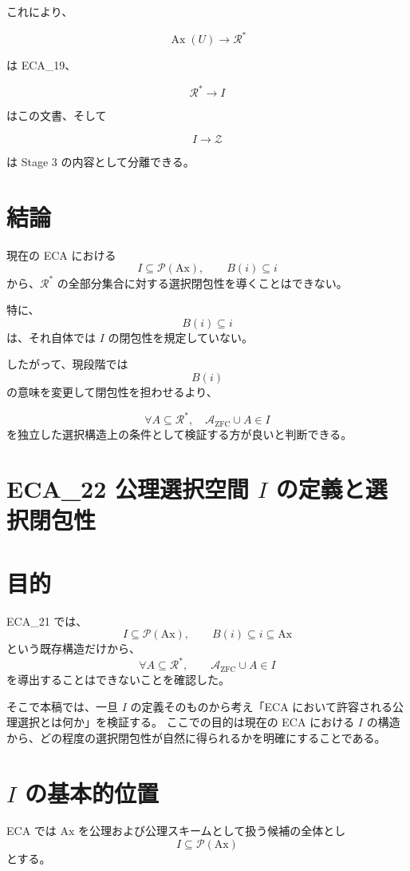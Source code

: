 \documentclass[a4paper,11pt]{article}
\newcommand{\Ax}{\mathrm{Ax}}
\begin{document}
これにより、

\[
\operatorname{Ax}(U)
\to
\mathcal{R}^*
\]

は ECA_19、

\[
\mathcal{R}^*
\to
I
\]

はこの文書、そして

\[
I
\to
\mathcal{Z}
\]

は Stage 3 の内容として分離できる。

\section{結論}

現在の ECA における
\[
I\subseteq\mathcal{P}(\Ax),
\qquad
B(i)\subseteq i
\]
から、$\mathcal{R}^*$ の全部分集合に対する選択閉包性を導くことはできない。

特に、
\[
B(i)\subseteq i
\]
は、それ自体では $I$ の閉包性を規定していない。

したがって、現段階では
\[
B(i)
\]
の意味を変更して閉包性を担わせるより、

\[
\boxed{
\forall A\subseteq\mathcal{R}^*,
\quad
\mathcal{A}_{\mathrm{ZFC}}\cup A\in I
}
\]
を独立した選択構造上の条件として検証する方が良いと判断できる。

\section{ECA_22 公理選択空間 $I$ の定義と選択閉包性}

\section{目的}

ECA_21 では、
\[
I\subseteq\mathcal{P}(\Ax),
\qquad
B(i)\subseteq i\subseteq\Ax
\]
という既存構造だけから、
\[
\forall A\subseteq\mathcal{R}^*,
\qquad
\mathcal{A}_{\mathrm{ZFC}}\cup A\in I
\]
を導出することはできないことを確認した。

そこで本稿では、一旦 $I$ の定義そのものから考え「ECA において許容される公理選択とは何か」を検証する。
ここでの目的は現在の ECA における $I$ の構造から、どの程度の選択閉包性が自然に得られるかを明確にすることである。

\section{$I$ の基本的位置}

ECA では $\Ax$ を公理および公理スキームとして扱う候補の全体とし
\[
I\subseteq\mathcal{P}(\Ax)
\]
とする。
\end{document}
